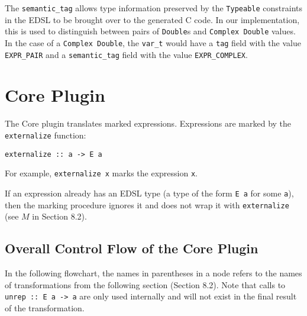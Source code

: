 \documentclass[sigplan,anonymous,review]{acmart}
\newcommand{\ttt}{\texttt}
\begin{document}
The \ttt{semantic\_tag} allows type information preserved by the \ttt{Typeable} constraints
in the EDSL to be brought over to the generated C code. In our implementation, this is
used to distinguish between pairs of \ttt{Double}s and \ttt{Complex Double} values. In the
case of a \ttt{Complex Double}, the \ttt{var\_t} would have a \ttt{tag} field with the value
\ttt{EXPR\_PAIR} and a \ttt{semantic\_tag} field with the value \ttt{EXPR\_COMPLEX}.

\section{Core Plugin}

The Core plugin translates marked expressions. Expressions are marked by
the \ttt{externalize} function:

\begin{lstlisting}
externalize :: a -> E a
\end{lstlisting}

For example, \ttt{externalize x} marks the expression \ttt{x}.

If an expression already has an EDSL type (a type of the form \ttt{E a} for some
\ttt{a}), then the marking procedure ignores it and does not wrap it with
\ttt{externalize} (see $M$ in Section 8.2).

\clearpage
\subsection{Overall Control Flow of the Core Plugin}

In the following flowchart, the names in parentheses in a node refers to the names of transformations from the following section (Section 8.2). Note that
calls to \ttt{unrep :: E a -> a} are only used internally and will not exist in the final result of the transformation.
\end{document}
